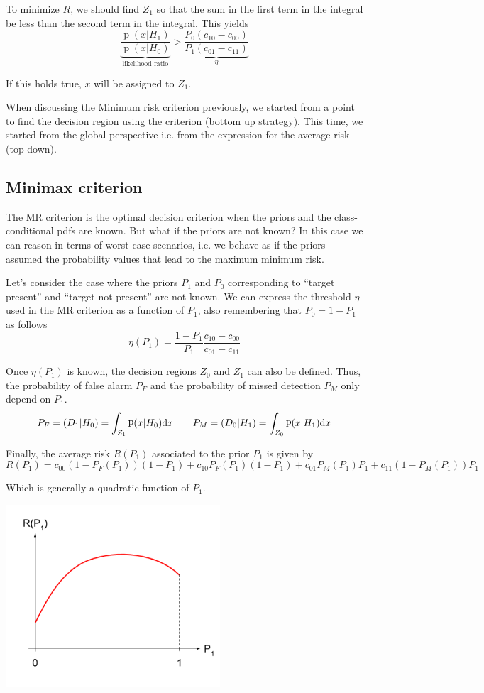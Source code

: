 \documentclass[oneside,onecolumn]{report}
\DeclareMathOperator*{\pdf}{p}
\let\P\relax
\DeclareMathOperator*{\P}{P}
\begin{document}
To minimize $R$, we should find $Z_1$ so that the sum in the first term in the integral be less than the second term in the integral.
This yields
$$ \underbrace{\frac{\pdf(x | H_1)}{\pdf(x | H_0)}}_\text{likelihood ratio} > \underbrace{\frac{P_0 (c_{10} - c_{00})}{P_1 (c_{01} - c_{11})}}_\eta $$

If this holds true, $x$ will be assigned to $Z_1$.

When discussing the Minimum risk criterion previously, we started from a point to find the decision region using the criterion (bottom up strategy). This time, we started from the global perspective i.e. from the expression for the average risk (top down).


\subsection{Minimax criterion}
The MR criterion is the optimal decision criterion when the priors and the class-conditional pdfs are known.
But what if the priors are not known?
In this case we can reason in terms of worst case scenarios, i.e. we behave as if the priors assumed the probability values that lead to the maximum minimum risk.

Let's consider the case where the priors $P_1$ and $P_0$ corresponding to ``target present'' and ``target not present'' are not known.
We can express the threshold $\eta$ used in the MR criterion as a function of $P_1$, also remembering that $P_0 = 1 - P_1$ as follows
$$ \eta(P_1) = \frac{1 - P_1}{P_1} \frac{c_{10} - c_{00}}{c_{01} - c_{11}} $$

Once $\eta(P_1)$ is known, the decision regions $Z_0$ and $Z_1$ can also be defined.
Thus, the probability of false alarm $P_F$ and the probability of missed detection $P_M$ only depend on $P_1$.
$$ P_F = \P(D_1 | H_0) = \int_{Z_1} \pdf(x | H_0) \dd x \qquad
P_M = \P(D_0 | H_1) = \int_{Z_0} \pdf(x | H_1) \dd x $$

Finally, the average risk $R(P_1)$ associated to the prior $P_1$ is given by
$$ R(P_1) =
c_{00} (1 - P_F(P_1)) (1 - P_1) +
c_{10} P_F(P_1) (1 - P_1) +
c_{01} P_M(P_1) P_1 +
c_{11} (1 - P_M(P_1)) P_1
$$

Which is generally a quadratic function of $P_1$.
\begin{center}
    \includegraphics[width=8cm]{minimum_risk_vs_p1.png}
\end{center}
\end{document}
